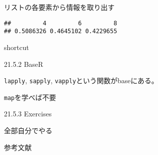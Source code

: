 \documentclass[ignorenonframetext,]{beamer}
\newenvironment{Shaded}{\begin{snugshade}}{\end{snugshade}}
\newcommand{\KeywordTok}[1]{\textcolor[rgb]{0.13,0.29,0.53}{\textbf{#1}}}
\newcommand{\StringTok}[1]{\textcolor[rgb]{0.31,0.60,0.02}{#1}}
\newcommand{\OperatorTok}[1]{\textcolor[rgb]{0.81,0.36,0.00}{\textbf{#1}}}
\newcommand{\NormalTok}[1]{#1}
\begin{document}
\begin{frame}[fragile]{リストの各要素から情報を取り出す}

\begin{Shaded}
\end{Shaded}

\begin{verbatim}
##         4         6         8 
## 0.5086326 0.4645102 0.4229655
\end{verbatim}

\begin{block}{shortcut}

\begin{Shaded}
\end{Shaded}

\end{block}

\end{frame}

\begin{frame}[fragile]{21.5.2 BaseR}

\texttt{lapply}, \texttt{sapply},
\texttt{vapply}という関数がbaseにある。

\texttt{map}を学べば不要

\end{frame}

\begin{frame}{21.5.3 Exercises}

全部自分でやる

\end{frame}

\begin{frame}{参考文献}

\end{frame}
\end{document}

